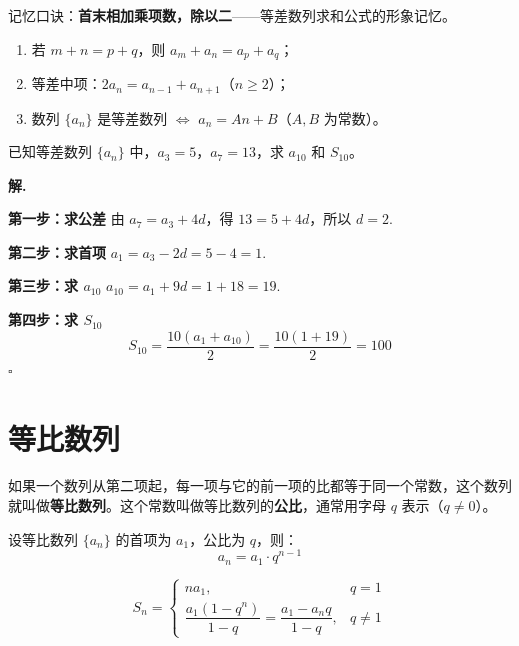 \begin{note}
记忆口诀：\textbf{首末相加乘项数，除以二}——等差数列求和公式的形象记忆。
\end{note}

\begin{property}[等差数列的性质]
\begin{enumerate}
    \item 若 $m + n = p + q$，则 $a_m + a_n = a_p + a_q$；
    \item 等差中项：$2a_n = a_{n-1} + a_{n+1}$（$n \geq 2$）；
    \item 数列 $\{a_n\}$ 是等差数列 $\Leftrightarrow$ $a_n = An + B$（$A, B$ 为常数）。
\end{enumerate}
\end{property}

\begin{example}
已知等差数列 $\{a_n\}$ 中，$a_3 = 5$，$a_7 = 13$，求 $a_{10}$ 和 $S_{10}$。
\end{example}

\textbf{解.}

\textbf{第一步：求公差}
由 $a_7 = a_3 + 4d$，得 $13 = 5 + 4d$，所以 $d = 2$.

\textbf{第二步：求首项}
$a_1 = a_3 - 2d = 5 - 4 = 1$.

\textbf{第三步：求 $a_{10}$}
$a_{10} = a_1 + 9d = 1 + 18 = 19$.

\textbf{第四步：求 $S_{10}$}
\[ S_{10} = \frac{10(a_1 + a_{10})}{2} = \frac{10(1 + 19)}{2} = 100 \]
\hfill $\square$

\section{等比数列}

\begin{definition}[等比数列]
如果一个数列从第二项起，每一项与它的前一项的比都等于同一个常数，这个数列就叫做\textbf{等比数列}。这个常数叫做等比数列的\textbf{公比}，通常用字母 $q$ 表示（$q \neq 0$）。
\end{definition}

\begin{theorem}[等比数列的通项公式]
设等比数列 $\{a_n\}$ 的首项为 $a_1$，公比为 $q$，则：
\[ a_n = a_1 \cdot q^{n-1} \]
\end{theorem}

\begin{theorem}
\[ S_n = \begin{cases} na_1, & q = 1 \\ \dfrac{a_1(1-q^n)}{1-q} = \dfrac{a_1 - a_nq}{1-q}, & q \neq 1 \end{cases} \]
\end{theorem}

